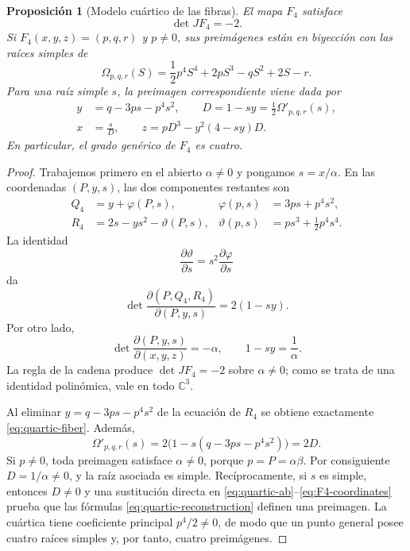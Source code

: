 \documentclass[11pt]{article}
\newtheorem{proposition}[theorem]{Proposici\'on}
\theoremstyle{definition}
\theoremstyle{remark}
\newcommand{\C}{\mathbb{C}}
\begin{document}
\begin{proposition}[Modelo cu\'artico de las fibras]\label{prop:quartic-model}
El mapa $F_4$ satisface
\[
\det JF_4=-2.
\]
Si $F_4(x,y,z)=(p,q,r)$ y $p\neq0$, sus preim\'agenes est\'an en biyecci\'on
con las ra\'ices simples de
\begin{equation}\label{eq:quartic-fiber}
\Omega_{p,q,r}(S)
=\frac12p^4S^4+2pS^3-qS^2+2S-r.
\end{equation}
Para una ra\'iz simple $s$, la preimagen correspondiente viene dada por
\begin{equation}\label{eq:quartic-reconstruction}
\begin{split}
y&=q-3ps-p^4s^2,\qquad D=1-sy=\frac12\Omega'_{p,q,r}(s),\\
x&=\frac{s}{D},\qquad
z=pD^3-y^2(4-sy)D.
\end{split}
\end{equation}
En particular, el grado gen\'erico de $F_4$ es cuatro.
\end{proposition}

\begin{proof}
Trabajemos primero en el abierto $\alpha\neq0$ y pongamos $s=x/\alpha$.
En las coordenadas $(P,y,s)$, las dos componentes restantes son
\begin{align*}
Q_4&=y+\varphi(P,s),
&\varphi(p,s)&=3ps+p^4s^2,\\
R_4&=2s-ys^2-\vartheta(P,s),
&\vartheta(p,s)&=ps^3+\frac12p^4s^4.
\end{align*}
La identidad
\[
\frac{\partial\vartheta}{\partial s}
=s^2\frac{\partial\varphi}{\partial s}
\]
da
\[
\det\frac{\partial(P,Q_4,R_4)}{\partial(P,y,s)}
=2(1-sy).
\]
Por otro lado,
\[
\det\frac{\partial(P,y,s)}{\partial(x,y,z)}=-\alpha,
\qquad
1-sy=\frac1\alpha.
\]
La regla de la cadena produce $\det JF_4=-2$ sobre $\alpha\neq0$; como se
trata de una identidad polin\'omica, vale en todo $\C^3$.

Al eliminar
$y=q-3ps-p^4s^2$ de la ecuaci\'on de $R_4$ se obtiene exactamente
\eqref{eq:quartic-fiber}. Adem\'as,
\begin{equation}\label{eq:quartic-derivative}
\Omega'_{p,q,r}(s)
=2\bigl(1-s(q-3ps-p^4s^2)\bigr)=2D.
\end{equation}
Si $p\neq0$, toda preimagen satisface $\alpha\neq0$, porque
$p=P=\alpha\beta$. Por consiguiente $D=1/\alpha\neq0$, y la ra\'iz asociada
es simple. Rec\'iprocamente, si $s$ es simple, entonces $D\neq0$ y una
sustituci\'on directa en \eqref{eq:quartic-ab}--\eqref{eq:F4-coordinates}
prueba que las f\'ormulas \eqref{eq:quartic-reconstruction} definen una
preimagen. La cu\'artica tiene coeficiente principal $p^4/2\neq0$, de modo que
un punto general posee cuatro ra\'ices simples y, por tanto, cuatro
preim\'agenes.
\end{proof}
\end{document}
